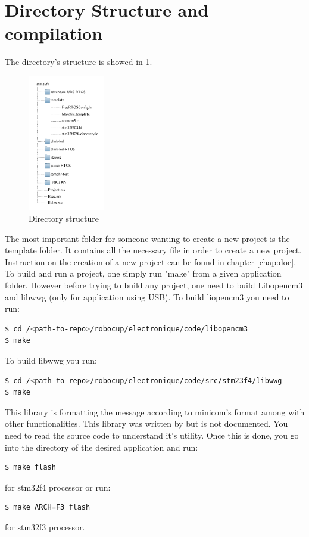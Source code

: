 \documentclass[12pt,a4paper]{report}
\begin{document}
\section{Directory Structure and compilation}
The directory's structure is showed in \ref{fig:dir}.

\begin{figure}
  \vspace{-20pt}
  \centering
  \includegraphics[width=0.30\textwidth]{figs/tree.pdf}
  \vspace{-10pt}
  \caption{Directory structure}
  \vspace{-118pt}
  \label{fig:dir}
\end{figure}
The most important folder for someone wanting to create a new project is the template folder. It contains all the necessary file in order to create a new project. Instruction on the creation of a new project can be found in chapter \ref{chap:doc}.
To build and run a project, one simply run "make" from a given application folder. However before trying to build any project, one need to build Libopencm3 and libwwg (only for application using USB). To build liopencm3 you need to run:

\begin{lstlisting}[language=bash]
$ cd /<path-to-repo>/robocup/electronique/code/libopencm3
$ make
\end{lstlisting}
To build libwwg you run: 
\begin{lstlisting}[language=bash]
$ cd /<path-to-repo>/robocup/electronique/code/src/stm23f4/libwwg
$ make
\end{lstlisting}
This library is formatting the message according to minicom's format among with other functionalities. This library was written by \cite{Gay2018} but is not documented. You need to read the source code to understand it's utility.
Once this is done, you go into the directory of the desired application and run:
\begin{lstlisting}[language=bash, label=code:f4]
$ make flash
\end{lstlisting}
for stm32f4 processor or run:
\begin{lstlisting}[language=bash, label=code:f3]
$ make ARCH=F3 flash
\end{lstlisting}
for stm32f3 processor.
\end{document}
